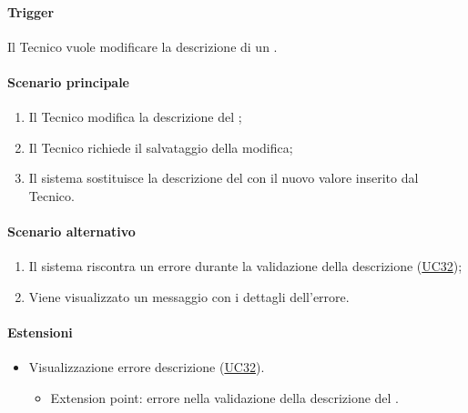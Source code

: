\paragraph*{Trigger}
Il Tecnico vuole modificare la descrizione di un .

\paragraph*{Scenario principale}
\begin{enumerate}
  \item Il Tecnico modifica la descrizione del ;
  \item Il Tecnico richiede il salvataggio della modifica;
  \item Il sistema sostituisce la descrizione del  con il nuovo valore inserito dal Tecnico.
\end{enumerate}

\paragraph*{Scenario alternativo}
\begin{enumerate}
  \item Il sistema riscontra un errore durante la validazione della descrizione (\hyperref[UC32]{UC32});
  \item Viene visualizzato un messaggio con i dettagli dell'errore.
\end{enumerate}

\paragraph*{Estensioni}
\begin{itemize}
  \item Visualizzazione errore descrizione  (\hyperref[UC32]{UC32}).
  \begin{itemize}
    \item Extension point: errore nella validazione della descrizione del .
  \end{itemize}
\end{itemize}